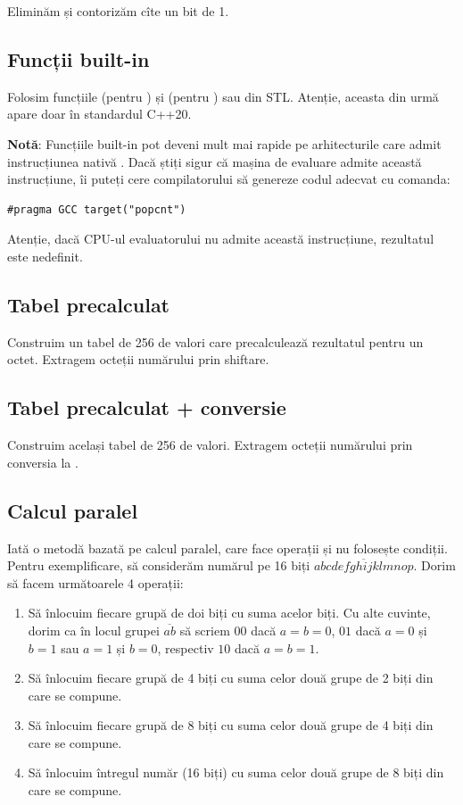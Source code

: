 Eliminăm și contorizăm cîte un bit de 1.

\subsection{Funcții built-in}

Folosim funcțiile  (pentru ) și  (pentru ) sau  din STL. Atenție, aceasta din urmă apare doar în standardul C++20.

\textbf{Notă}: Funcțiile built-in pot deveni mult mai rapide pe arhitecturile care admit instrucțiunea nativă . Dacă știți sigur că mașina de evaluare admite această instrucțiune, îi puteți cere compilatorului să genereze codul adecvat cu comanda:

\begin{verbatim}
#pragma GCC target("popcnt")
\end{verbatim}

Atenție, dacă CPU-ul evaluatorului nu admite această instrucțiune, rezultatul este nedefinit.

\subsection{Tabel precalculat}

Construim un tabel de 256 de valori care precalculează rezultatul pentru un octet. Extragem octeții numărului prin shiftare.

\subsection{Tabel precalculat + conversie}

Construim același tabel de 256 de valori. Extragem octeții numărului prin conversia la .

\subsection{Calcul paralel}

Iată o metodă bazată pe calcul paralel, care face  operații și nu folosește condiții. Pentru exemplificare, să considerăm numărul pe 16 biți $\overline{abcdefghijklmnop}$. Dorim să facem următoarele 4 operații:

\begin{enumerate}
  \item Să înlocuim fiecare grupă de doi biți cu suma acelor biți. Cu alte cuvinte, dorim ca în locul grupei $\overline{ab}$ să scriem $00$ dacă $a=b=0$, $01$ dacă $a=0$ și $b=1$ sau $a=1$ și $b=0$, respectiv $10$ dacă $a=b=1$.
  \item Să înlocuim fiecare grupă de 4 biți cu suma celor două grupe de 2 biți din care se compune.
  \item Să înlocuim fiecare grupă de 8 biți cu suma celor două grupe de 4 biți din care se compune.
  \item Să înlocuim întregul număr (16 biți) cu suma celor două grupe de 8 biți din care se compune.
\end{enumerate}

